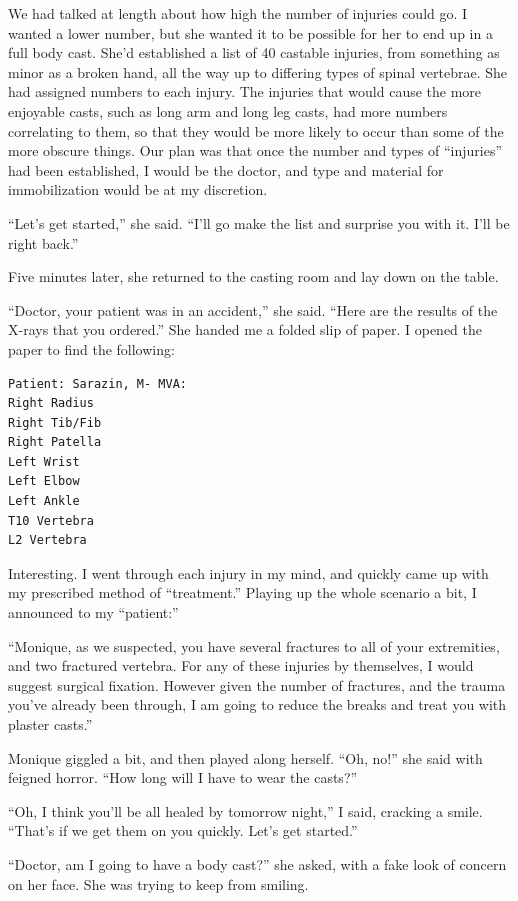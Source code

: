 We had talked at length about how high the number of injuries could go. I wanted a lower
number, but she wanted it to be possible for her to end up in a full body cast. She'd
established a list of 40 castable injuries, from something as minor as a broken hand, all the
way up to differing types of spinal vertebrae. She had assigned numbers to each injury. The
injuries that would cause the more enjoyable casts, such as long arm and long leg casts, had
more numbers correlating to them, so that they would be more likely to occur than some of the
more obscure things. Our plan was that once the number and types of ``injuries'' had been
established, I would be the doctor, and type and material for immobilization would be at my
discretion.

``Let's get started,'' she said. ``I'll go make the list and surprise you with it. I'll be
right back.''

Five minutes later, she returned to the casting room and lay down on the table.

``Doctor, your patient was in an accident,'' she said. ``Here are the results of the X-rays
that you ordered.'' She handed me a folded slip of paper. I opened the paper to find the
following:

\begin{verbatim}
Patient: Sarazin, M- MVA:
Right Radius
Right Tib/Fib
Right Patella
Left Wrist
Left Elbow
Left Ankle
T10 Vertebra
L2 Vertebra
\end{verbatim}

Interesting. I went through each injury in my mind, and quickly came up with my prescribed
method of ``treatment.'' Playing up the whole scenario a bit, I announced to my ``patient:''

``Monique, as we suspected, you have several fractures to all of your extremities, and two
fractured vertebra. For any of these injuries by themselves, I would suggest surgical fixation.
However given the number of fractures, and the trauma you've already been through, I am going to
reduce the breaks and treat you with plaster casts.''

Monique giggled a bit, and then played along herself. ``Oh, no!'' she said with feigned
horror. ``How long will I have to wear the casts?''

``Oh, I think you'll be all healed by tomorrow night,'' I said, cracking a smile. ``That's if
we get them on you quickly. Let's get started.''

``Doctor, am I going to have a body cast?'' she asked, with a fake look of concern on her
face. She was trying to keep from smiling.

